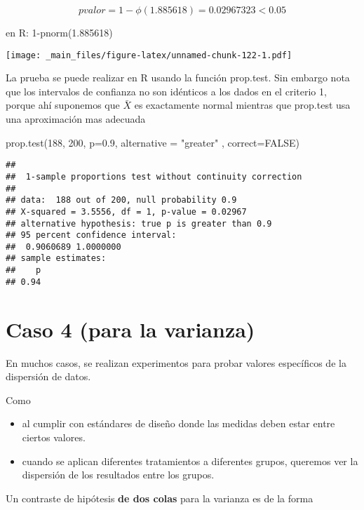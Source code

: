 \documentclass[
]{book}
\newenvironment{Shaded}{\begin{snugshade}}{\end{snugshade}}
\newcommand{\AttributeTok}[1]{\textcolor[rgb]{0.77,0.63,0.00}{#1}}
\newcommand{\ConstantTok}[1]{\textcolor[rgb]{0.00,0.00,0.00}{#1}}
\newcommand{\DecValTok}[1]{\textcolor[rgb]{0.00,0.00,0.81}{#1}}
\newcommand{\FloatTok}[1]{\textcolor[rgb]{0.00,0.00,0.81}{#1}}
\newcommand{\FunctionTok}[1]{\textcolor[rgb]{0.00,0.00,0.00}{#1}}
\newcommand{\NormalTok}[1]{#1}
\newcommand{\StringTok}[1]{\textcolor[rgb]{0.31,0.60,0.02}{#1}}
\begin{document}
\[pvalor=1-\phi(1.885618)=0.02967323<0.05\]

en R: 1-pnorm(1.885618)

\texttt{[image: \_main\_files/figure-latex/unnamed-chunk-122-1.pdf]}

La prueba se puede realizar en R usando la función prop.test. Sin embargo nota que los intervalos de confianza no son idénticos a los dados en el criterio 1, porque ahí suponemos que \(\bar{X}\) es exactamente normal mientras que prop.test usa una aproximación mas adecuada

\begin{Shaded}
\begin{Highlighting}[]
\FunctionTok{prop.test}\NormalTok{(}\DecValTok{188}\NormalTok{, }\DecValTok{200}\NormalTok{, }\AttributeTok{p=}\FloatTok{0.9}\NormalTok{, }\AttributeTok{alternative =} \StringTok{"greater"}\NormalTok{ , }\AttributeTok{correct=}\ConstantTok{FALSE}\NormalTok{)}
\end{Highlighting}
\end{Shaded}

\begin{verbatim}
## 
##  1-sample proportions test without continuity correction
## 
## data:  188 out of 200, null probability 0.9
## X-squared = 3.5556, df = 1, p-value = 0.02967
## alternative hypothesis: true p is greater than 0.9
## 95 percent confidence interval:
##  0.9060689 1.0000000
## sample estimates:
##    p 
## 0.94
\end{verbatim}

\hypertarget{caso-4-para-la-varianza}{%
\section{Caso 4 (para la varianza)}\label{caso-4-para-la-varianza}}

En muchos casos, se realizan experimentos para probar valores específicos de la dispersión de datos.

Como

\begin{itemize}
\item
  al cumplir con estándares de diseño donde las medidas deben estar entre ciertos valores.
\item
  cuando se aplican diferentes tratamientos a diferentes grupos, queremos ver la dispersión de los resultados entre los grupos.
\end{itemize}

Un contraste de hipótesis \textbf{de dos colas} para la varianza es de la forma
\end{document}
